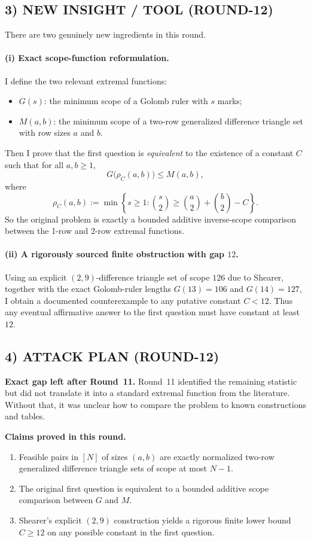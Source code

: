 \subsection{3) NEW INSIGHT / TOOL (ROUND-12)}

There are two genuinely new ingredients in this round.

\paragraph{(i) Exact scope-function reformulation.}
I define the two relevant extremal functions:
\begin{itemize}
\item $G(s)$: the minimum scope of a Golomb ruler with $s$ marks;
\item $M(a,b)$: the minimum scope of a two-row generalized difference triangle set with row sizes $a$ and $b$.
\end{itemize}
Then I prove that the first question is \emph{equivalent} to the existence of a constant $C$ such that for all $a,b\ge 1$,
\[
G\bigl(\rho_C(a,b)\bigr)\le M(a,b),
\]
where
\[
\rho_C(a,b):=\min\left\{s\ge 1:\binom{s}{2}\ge \binom{a}{2}+\binom{b}{2}-C\right\}.
\]
So the original problem is exactly a bounded additive inverse-scope comparison between the 1-row and 2-row extremal functions.

\paragraph{(ii) A rigorously sourced finite obstruction with gap $12$.}
Using an explicit $(2,9)$-difference triangle set of scope $126$ due to Shearer, together with the exact Golomb-ruler lengths $G(13)=106$ and $G(14)=127$, I obtain a documented counterexample to any putative constant $C<12$. Thus any eventual affirmative answer to the first question must have constant at least $12$.

\subsection{4) ATTACK PLAN (ROUND-12)}

\textbf{Exact gap left after Round~11.}
Round~11 identified the remaining statistic but did not translate it into a standard extremal function from the literature. Without that, it was unclear how to compare the problem to known constructions and tables.

\textbf{Claims proved in this round.}
\begin{enumerate}
\item Feasible pairs in $[N]$ of sizes $(a,b)$ are exactly normalized two-row generalized difference triangle sets of scope at most $N-1$.
\item The original first question is equivalent to a bounded additive scope comparison between $G$ and $M$.
\item Shearer's explicit $(2,9)$ construction yields a rigorous finite lower bound $C\ge 12$ on any possible constant in the first question.
\end{enumerate}

